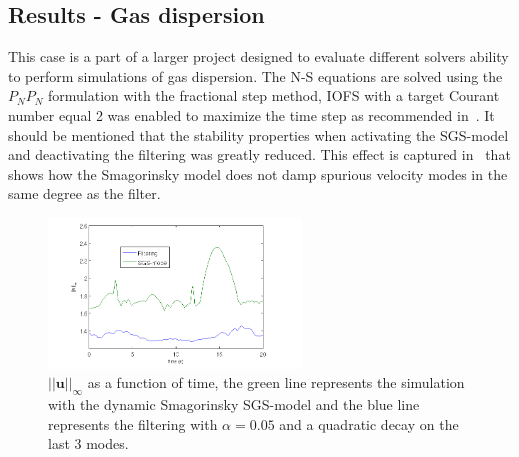 \subsection{Results - Gas dispersion} 
This case is a part of a larger project designed to evaluate different solvers 
ability to perform simulations of gas dispersion. The N-S equations are solved using
the $P_NP_N$ formulation with the fractional step method, IOFS with a target Courant number 
equal 2 was enabled to maximize the time step as recommended in~\cite{Nek}. It should be 
mentioned that the stability properties when activating the SGS-model and deactivating the 
filtering was greatly reduced. This effect is captured in~ that shows how 
the Smagorinsky model does not damp spurious velocity modes in the same degree as the filter. 
%
\begin{figure}[h]
	\centering
	\includegraphics[width=0.6\textwidth]{Figures/maxvel.png}
    \caption{$||\mathbf{u}||_{\infty}$ as a function of time, the green line represents the 
simulation with the dynamic Smagorinsky SGS-model and the blue line represents the filtering 
with $\alpha = 0.05$ and a quadratic decay on the last 3 modes.}
	\label{fig:maxvel}
\end{figure}
%
%
%
%
%

